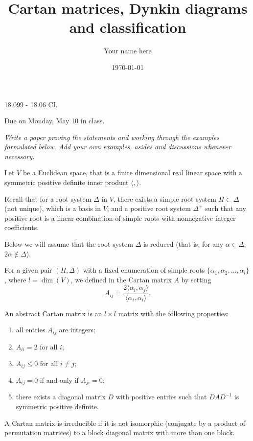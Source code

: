 \documentclass[11pt]{amsart}
\newcommand{\la}{\langle}
\newcommand{\ra}{\rangle}
\begin{document}
\title{Cartan matrices, Dynkin diagrams and classification}
\author{Your name here}
\date{\today}
\maketitle


{\Large  18.099 - 18.06 CI.} 

{Due on Monday, May 10 in class.} 

\vspace{1cm} 

{\it Write a paper proving the statements and working through the examples 
formulated below. Add your own examples, asides and discussions 
whenever necessary. }

Let $V$ be a Euclidean space, that is  
a finite dimensional real linear space with a symmetric 
positive definite inner product $\la, \ra$. 

Recall that for a root system $\Delta$ in  
$V$, there exists a simple root system 
$\Pi \subset \Delta$ (not unique), which is a basis in $V$, 
and a positive root system $\Delta^+$ 
such that any positive root is a linear combination of simple roots with 
nonnegative integer coefficients. 

Below we will assume that the root system $\Delta$ is reduced (that is, 
for any $\alpha \in \Delta$, $2\alpha \notin \Delta$). 

For a given pair $(\Pi, \Delta)$ with a fixed enumeration of simple roots 
$\{ \alpha_1, \alpha_2, \ldots, \alpha_l \}$, where $l = \dim(V)$, 
we defined in \cite{5}  
the Cartan matrix $A$ by setting  
$$ A_{ij} = \frac{2\langle \alpha_i, \alpha_j \rangle}{\langle \alpha_i, 
\alpha_i \rangle}.$$ 

An abstract Cartan matrix is an $l\times l$ matrix with the following 
properties: 
\begin{enumerate} 
\item{all entries $A_{ij}$ are integers;}
\item{$A_{ii}=2$ for all $i$;}
\item{$A_{ij} \leq 0$ for all $i \neq j$;}
\item{$A_{ij}=0$ if and only if $A_{ji}=0$;}
\item{there exists a diagonal matrix $D$ with positive entries such 
that $DAD^{-1}$ is symmetric positive definite.}
\end{enumerate}

A Cartan matrix is irreducible if it is not isomorphic (conjugate by 
a product of permutation matrices) 
to a block diagonal matrix with more than one block.  
\end{document}
